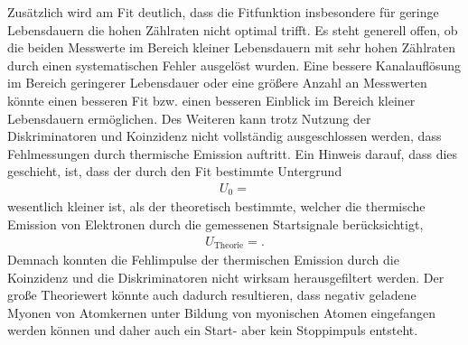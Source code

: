 Zusätzlich wird am Fit deutlich, dass die Fitfunktion insbesondere für geringe Lebensdauern die hohen Zählraten nicht optimal trifft.
Es steht generell offen, ob die beiden Messwerte im Bereich kleiner Lebensdauern mit sehr hohen Zählraten durch einen systematischen Fehler ausgelöst wurden. %
Eine bessere Kanalauflösung im Bereich geringerer Lebensdauer oder eine größere Anzahl an Messwerten könnte einen besseren Fit bzw. einen besseren Einblick im Bereich kleiner Lebensdauern ermöglichen.
Des Weiteren kann trotz Nutzung der Diskriminatoren und Koinzidenz nicht vollständig ausgeschlossen werden, dass Fehlmessungen durch thermische Emission auftritt. %
Ein Hinweis darauf, dass dies geschieht, ist, dass der durch den Fit bestimmte Untergrund
\begin{align*}
  U_0 = 
\end{align*}
wesentlich kleiner ist, als der theoretisch bestimmte, welcher die thermische Emission von Elektronen durch die gemessenen Startsignale berücksichtigt,
\begin{align*}
  U_{\text{Theorie}} = .
\end{align*}
Demnach konnten die Fehlimpulse der thermischen Emission durch die Koinzidenz und die Diskriminatoren nicht wirksam herausgefiltert werden.
Der große Theoriewert könnte auch dadurch resultieren, dass negativ geladene Myonen von Atomkernen unter Bildung von myonischen Atomen eingefangen werden können und daher auch ein Start- aber kein Stoppimpuls entsteht.
